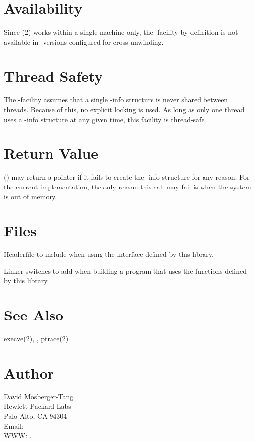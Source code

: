 \documentclass{article}
\begin{document}
\section{Availability}

Since (2) works within a single machine only, the
-facility by definition is not available in
-versions configured for cross-unwinding.

\section{Thread Safety}

The -facility assumes that a single -info
structure is never shared between threads.  Because of this, no
explicit locking is used.  As long as only one thread uses
a -info structure at any given time, this facility
is thread-safe.

\section{Return Value}

() may return a  pointer if it fails
to create the -info-structure for any reason.  For the
current implementation, the only reason this call may fail is when the
system is out of memory.

\section{Files}

\begin{Description}
\item[\File{libunwind-ptrace.h}] Headerfile to include when using the
  interface defined by this library.
\item[\Opt{-l}\File{unwind-ptrace} \Opt{-l}\File{unwind-generic}]
    Linker-switches to add when building a program that uses the
    functions defined by this library.
\end{Description}

\section{See Also}

execve(2),
,
ptrace(2)

\section{Author}

\noindent
David Mosberger-Tang\\
Hewlett-Packard Labs\\
Palo-Alto, CA 94304\\
Email: \\
WWW: .
\LatexManEnd
\end{document}
